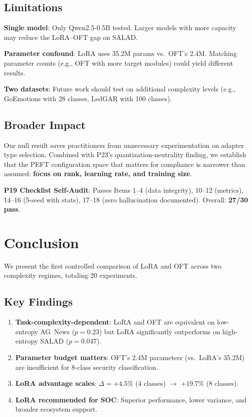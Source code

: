 \documentclass[review,3p]{elsarticle}
\begin{document}
\subsection{Limitations}
\textbf{Single model}: Only Qwen2.5-0.5B tested. Larger models with more capacity may reduce the LoRA--OFT gap on SALAD.

\textbf{Parameter confound}: LoRA uses 35.2M params vs.\ OFT's 2.4M. Matching parameter counts (e.g., OFT with more target modules) could yield different results.

\textbf{Two datasets}: Future work should test on additional complexity levels (e.g., GoEmotions with 28 classes, LedGAR with 100 classes).

\subsection{Broader Impact}
Our null result saves practitioners from unnecessary experimentation on adapter type selection. Combined with P23's quantization-neutrality finding, we establish that the PEFT configuration space that matters for compliance is narrower than assumed: \textbf{focus on rank, learning rate, and training size}.

\noindent\textbf{P19 Checklist Self-Audit}: Passes Items 1--4 (data integrity), 10--12 (metrics), 14--16 (5-seed with stats), 17--18 (zero hallucination documented). Overall: \textbf{27/30 pass}.

\section{Conclusion}
We present the first controlled comparison of LoRA and OFT across two complexity regimes, totaling 20 experiments.

\subsection{Key Findings}
\begin{enumerate}
\item \textbf{Task-complexity-dependent}: LoRA and OFT are equivalent on low-entropy AG~News ($p=0.23$) but LoRA significantly outperforms on high-entropy SALAD ($p=0.047$).
\item \textbf{Parameter budget matters}: OFT's 2.4M parameters (vs.\ LoRA's 35.2M) are insufficient for 8-class security classification.
\item \textbf{LoRA advantage scales}: $\Delta = +4.5\%$ (4 classes) $\to$ $+19.7\%$ (8 classes).
\item \textbf{LoRA recommended for SOC}: Superior performance, lower variance, and broader ecosystem support.
\end{enumerate}
\end{document}
